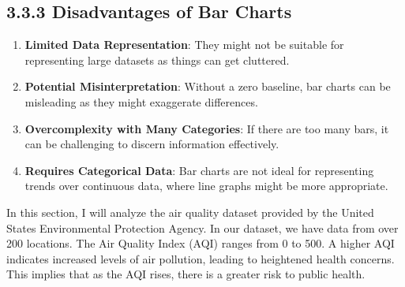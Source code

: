 \documentclass{article}\usepackage[]{graphicx}\usepackage[]{xcolor}
\begin{document}
\subsection*{3.3.3 Disadvantages of Bar Charts}
\begin{enumerate}
    \item \textbf{Limited Data Representation}: They might not be suitable for representing large datasets as things can get cluttered.
    \item \textbf{Potential Misinterpretation}: Without a zero baseline, bar charts can be misleading as they might exaggerate differences.
    \item \textbf{Overcomplexity with Many Categories}: If there are too many bars, it can be challenging to discern information effectively.
    \item \textbf{Requires Categorical Data}: Bar charts are not ideal for representing trends over continuous data, where line graphs might be more appropriate.
\end{enumerate}

In this section, I will analyze the air quality dataset provided by the United States Environmental Protection Agency. In our dataset, we have data from over 200 locations. The Air Quality Index (AQI) ranges from 0 to 500. A higher AQI indicates increased levels of air pollution, leading to heightened health concerns. This implies that as the AQI rises, there is a greater risk to public health.
\end{document}
